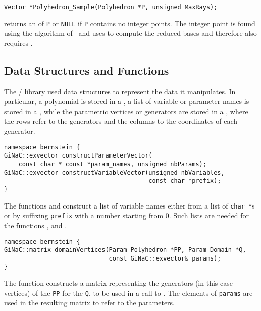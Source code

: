 \begin{verbatim}
Vector *Polyhedron_Sample(Polyhedron *P, unsigned MaxRays);
\end{verbatim}
 returns an  of {\tt P}
or {\tt NULL} if {\tt P} contains no integer points.
The integer point is found using the algorithm
of~ and uses
 to compute the reduced bases
and therefore also requires .

\subsection{\protect{} Data Structures and Functions}

The \bernstein/ library used  data structures to
represent the data it manipulates.
In particular, a polynomial is stored in a ,
a list of variable or parameter names is stored in a ,
while the parametric vertices or generators are stored in a ,
where the rows refer to the generators and the columns to the coordinates
of each generator.

\begin{verbatim}
namespace bernstein {
GiNaC::exvector constructParameterVector(
    const char * const *param_names, unsigned nbParams);
GiNaC::exvector constructVariableVector(unsigned nbVariables,
                                        const char *prefix);
}
\end{verbatim}
The functions 
and  construct a list of variable
names either from a list of {\tt char *}s or 
by suffixing {\tt prefix} with a number starting from 0.
Such lists are needed for the functions
, 
and .

\begin{verbatim}
namespace bernstein {
GiNaC::matrix domainVertices(Param_Polyhedron *PP, Param_Domain *Q, 
                             const GiNaC::exvector& params);
}
\end{verbatim}
The function  constructs a matrix representing the
generators (in this case vertices) of the  {\tt PP}
for the  {\tt Q}, to be used
in a call to .
The elements of {\tt params} are used in the resulting matrix
to refer to the parameters.

